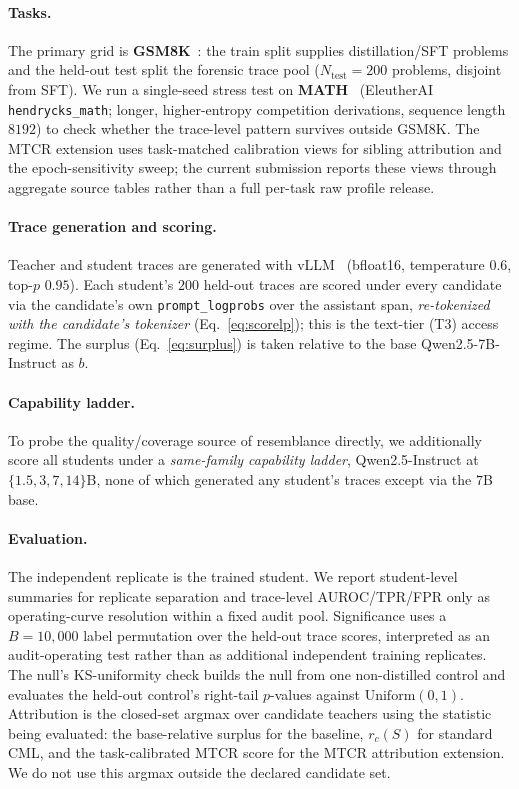 \paragraph{Tasks.}
The primary grid is \textbf{GSM8K}~\citep{cobbe2021gsm8k}: the train split supplies distillation/SFT problems and the
held-out test split the forensic trace pool ($N_{\mathrm{test}}=200$ problems, disjoint from SFT).
We run a single-seed stress test on \textbf{MATH}~\citep{hendrycks2021math}
(EleutherAI \texttt{hendrycks\_math}; longer, higher-entropy competition derivations,
sequence length $8192$) to check whether the trace-level pattern survives outside
GSM8K. The MTCR extension uses task-matched calibration views for sibling
attribution and the epoch-sensitivity sweep; the current submission reports these
views through aggregate source tables rather than a full per-task raw profile release.

\paragraph{Trace generation and scoring.}
Teacher and student traces are generated with vLLM~\citep{kwon2023vllm}
(bfloat16, temperature $0.6$, top-$p$ $0.95$).
Each student's $200$ held-out traces are scored under every candidate via the candidate's own
\texttt{prompt\_logprobs} over the assistant span, \emph{re-tokenized with the candidate's tokenizer}
(Eq.~\eqref{eq:scorelp}); this is the text-tier (T3) access regime. The surplus
(Eq.~\eqref{eq:surplus}) is taken relative to the base Qwen2.5-7B-Instruct as $b$.

\paragraph{Capability ladder.}
To probe the quality/coverage source of resemblance directly, we additionally score all students
under a \emph{same-family capability ladder}, Qwen2.5-Instruct at $\{1.5,3,7,14\}$B, none of which
generated any student's traces except via the $7$B base.

\paragraph{Evaluation.}
The independent replicate is the trained student. We report student-level summaries
for replicate separation and trace-level AUROC/TPR/FPR only as operating-curve
resolution within a fixed audit pool. Significance uses a $B=10{,}000$ label
permutation over the held-out trace scores, interpreted as an audit-operating test
rather than as additional independent training replicates. The null's KS-uniformity
check builds the null from one non-distilled control and evaluates the held-out
control's right-tail $p$-values against $\mathrm{Uniform}(0,1)$. Attribution is the
closed-set argmax over candidate teachers using the statistic being evaluated:
the base-relative surplus for the baseline, $r_c(S)$ for standard CML, and the
task-calibrated MTCR score for the MTCR attribution extension. We do not use this
argmax outside the declared candidate set.

